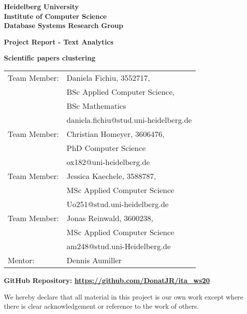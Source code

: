 \documentclass[
     12pt,         %
     a4paper,      %
     BCOR10mm,     %
     DIV14,        %
     ]{article}
\begin{document}
\begin{titlepage}


\begin{center}
\textbf{ 
\Large Heidelberg University\\
\smallskip
\Large Institute of Computer Science\\
\smallskip
\Large Database Systems Research Group\\
\smallskip
}

\vspace{2cm}

\textbf{\large Project Report - Text Analytics}

\vspace{0.5\baselineskip}
{\huge
\textbf{Scientific papers clustering}
}
\end{center}

\vfill 

{\large
\begin{tabular}[l]{ll}
Team Member: & Daniela Fichiu, 3552717,\\& BSc Applied Computer Science,\\
  & BSc Mathematics\\
  & daniela.fichiu@stud.uni-heidelberg.de\\
Team Member: & Christian Homeyer, 3606476,\\ & PhD Computer Science \\
  & ox182@uni-heidelberg.de\\
Team Member: & Jessica Kaechele, 3588787,\\ & MSc Applied Computer Science\\
  & Uo251@stud.uni-heidelberg.de\\
Team Member: & Jonas Reinwald, 3600238, \\ & MSc Applied Computer Science\\
  & am248@stud.uni-Heidelberg.de\\
Mentor: & Dennis Aumiller
  
\end{tabular}
}
\vspace*{1cm}

{
  \textbf{GitHub Repository: \url{https://github.com/DonatJR/ita_ws20}}
}
\vspace*{.5cm}

\begin{center}
{
We  hereby  declare  that  all  material  in  this  project  is  our  own  work except where there is clear acknowledgement or reference to the work of others. } 
\end{center}


\end{titlepage}


% 










\end{document}
